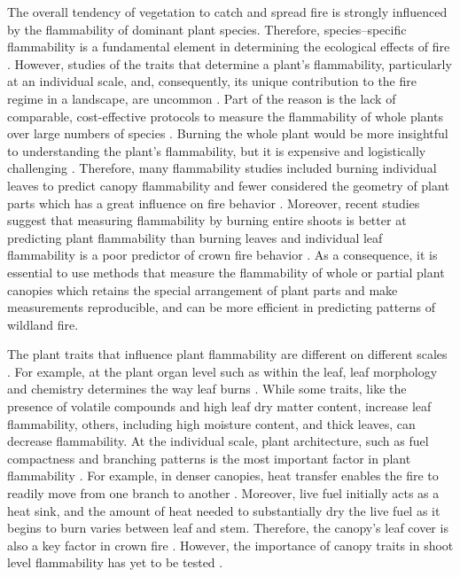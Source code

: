 \documentclass{bmcart}
\begin{document}
The overall tendency of vegetation to catch and spread fire is strongly influenced by the flammability of dominant plant species. Therefore, species--specific flammability is a fundamental element in determining the ecological effects of fire \citep{bond1995kill, lavorel2002predicting, bond2005fire, wyse2018shoot}. However, studies of the traits that determine a plant's flammability, particularly at an individual scale, and, consequently, its unique contribution to the fire regime in a landscape, are uncommon \citep{jaureguiberry2011device, schwilk2015dimensions, pausas2017flammability}. Part of the reason is the lack of comparable, cost-effective protocols to measure the flammability of whole plants over large numbers of species \citep{jaureguiberry2011device}. Burning the whole plant would be more insightful to understanding the plant's flammability, but it is expensive and logistically challenging \citep{jaureguiberry2011device, pausasandmoi2012flammability}. Therefore, many flammability studies included burning individual leaves to predict canopy flammability and fewer considered the geometry of plant parts which has a great influence on fire behavior \citep{schwilk2003flammability, madrigal2012evaluation, pausas2012firesulex, calitz2015investigating, gao2018grass}. Moreover, recent studies suggest that measuring flammability by burning entire shoots is better at predicting plant flammability than burning leaves \citep{alam2020shoot} and individual leaf flammability is a poor predictor of crown fire behavior \citep{fernandes2012plant}. As a consequence, it is essential to use methods that measure the flammability of whole or partial plant canopies which retains the special arrangement of plant parts and make measurements reproducible, and can be more efficient in predicting 
patterns of wildland fire.



The plant traits that influence plant flammability are different on different scales \citep{pausas2017flammability}. For example, at the plant organ level such as within  the leaf, leaf morphology and chemistry determines the way leaf burns \citep{anderson1970forest, owens1998seasonal, schwilk2011scaling, pausas2016secondary, guerrero2021leaf, ganteaume2021volatile,alam2020shoot}. While some traits, like the presence of volatile compounds and high leaf dry matter content, increase leaf flammability, others, including high moisture content, and thick leaves, can decrease flammability. At the individual scale, plant architecture, such as fuel compactness and branching patterns is %
the most important factor in plant flammability \citep{schwilk2003flammability, madrigal2012evaluation}. For example, in denser canopies, heat transfer enables the fire to readily move from one branch to another \citep{bond1996fire}. Moreover, live fuel initially acts as a heat sink, and the amount of heat needed to substantially dry the live fuel as it begins to burn varies between %
leaf and stem. Therefore, the canopy's leaf cover is  also a key factor in crown fire \citep{ray2005micrometeorological}. However, the importance of canopy traits in shoot level flammability has yet to be tested \citep{alam2020shoot}.
\end{document}
